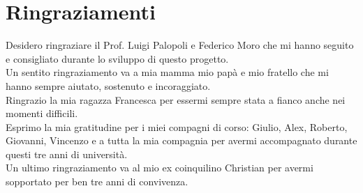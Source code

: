 \chapter*{Ringraziamenti}
\thispagestyle{empty}

Desidero ringraziare il Prof. Luigi Palopoli e Federico Moro che mi hanno seguito e consigliato durante lo sviluppo di questo progetto.\\

Un sentito ringraziamento va a mia mamma mio papà e mio fratello che mi hanno sempre aiutato, sostenuto e incoraggiato.\\

Ringrazio la mia ragazza Francesca per essermi sempre stata a fianco anche nei momenti difficili.\\

Esprimo la mia gratitudine per i miei compagni di corso: Giulio, Alex, Roberto, Giovanni, Vincenzo e a tutta la mia compagnia per avermi accompagnato durante questi tre anni di università.\\

Un ultimo ringraziamento va al mio ex coinquilino Christian per avermi sopportato per ben tre anni di convivenza.
